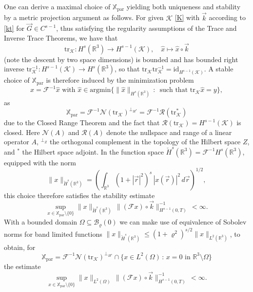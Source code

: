 \documentclass{ws-m3as}
\newcommand\Xpar{\mathbb{X}_{\text{par}}}
\begin{document}
One can derive a maximal choice of $\Xpar$ yielding both uniqueness and stability by a metric projection argument as follows.
For given $\mathcal{K}$ \eqref{K} with ${\vec k}$ according to \eqref{kt} for ${\vec G}\in C^{s-1}$, thus satisfying the regularity assumptions of the Trace and Inverse Trace Theorems, 
we have that 
\[
\text{tr}_{\mathcal{K}}:H^s(\mathbb{R}^3)\to H^{s-1}(\mathcal{K}), \quad
\hat{x}\mapsto\hat{x}\circ{\vec k}
\]
(note the descent by two space dimensions) is bounded and has bounded right inverse $\text{tr}_{\mathcal{K}}^{-1}:H^{s-1}(\mathcal{K})\to H^s(\mathbb{R}^3)$, 
so that $\text{tr}_{\mathcal{K}}\text{tr}_{\mathcal{K}}^{-1}=\text{id}_{H^{s-1}(\mathcal{K})}$.
A stable choice of $\Xpar$ is therefore induced by the minimization problem
\[
x=\mathcal{F}^{-1}\hat{x} \text{ with }\hat{x}\in\text{argmin}\{\|\hat{x}\|_{H^s(\mathbb{R}^3)}\, : \,  \text{ such that }\text{tr}_{\mathcal{K}}\hat{x}=y\},
\]
as 
\[
\Xpar=\mathcal{F}^{-1}\mathcal{N}(\text{tr}_{\mathcal{K}})^{\bot_{H^s}}
=\mathcal{F}^{-1}\mathcal{R}(\text{tr}_{\mathcal{K}}^*)
\]
due to the Closed Range Theorem 
and the fact that $\mathcal{R}(\text{tr}_{\mathcal{K}})=H^{s-1}(\mathcal{K})$ is closed.
Here $\mathcal{N}(A)$ and $\mathcal{R}(A)$ denote the nullspace and range of a linear operator $A$, ${}^{\bot_Z}$ the orthogonal complement in the topology of the Hilbert space $Z$, and ${}^*$ the Hilbert space adjoint. 
In the function space $\check{H}^s(\mathbb{R}^3)=\mathcal{F}^{-1}H^s(\mathbb{R}^3)$, equipped with the norm
\[
\|x\|_{\check{H}^s(\mathbb{R}^3)}
=\left(\int_{\mathbb{R}^3}(1+|\vec r|^2)^s\, |x(\vec r)|^2\, d\vec r\right)^{1/2},
\]
this choice therefore satisfies the stability estimate
\[
\sup_{x\in\Xpar\setminus\{0\}} \|x\|_{\check{H}^s(\mathbb{R}^3)}\,\|(\mathcal{F}x)\circ{\vec k}\|_{H^{s-1}(0,T)}^{-1}\,<\infty.
\]
With a bounded domain $\Omega\subseteq\mathcal{B}_\varrho(0)$ we can make use of equivalence of Sobolev norms for band limited functions 
$\|x\|_{\check{H}^s(\mathbb{R}^3)}\leq (1+\varrho^2)^{s/2}\|x\|_{L^2(\mathbb{R}^3)}$, 
to obtain, for 
\[
\Xpar=\mathcal{F}^{-1}\mathcal{N}(\text{tr}_{\mathcal{K}})^{\bot_{H^s}}\cap \{x\in L^2(\Omega)\, : \, x=0\text{ in }\mathbb{R}^3\setminus\Omega\}
\]
the estimate 
\begin{equation}\label{CI_idealcoils}
\sup_{x\in\Xpar\setminus\{0\}} \|x\|_{L^2(\Omega)}\,\|(\mathcal{F}x)\circ{\vec k}\|_{H^{s-1}(0,T)}^{-1}\,<\infty.
\end{equation}
\end{document}
